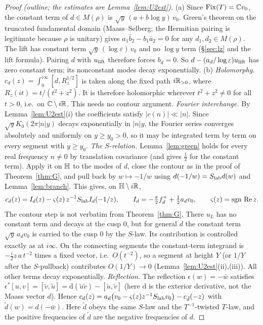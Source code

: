 \begin{proof}[Proof (outline; the estimates are Lemma~\ref{lem:U2est})]
(a) Since $\mathrm{Fix}(T)=\mathbb{C} v_0$, the constant term of $d\in M(\rho)$ is $\sqrt y\,(a+b\log y)\,v_0$. Green's theorem on the truncated fundamental domain (Maass--Selberg; the Hermitian pairing is legitimate because $\rho$ is unitary) gives $a_1\bar b_2-b_1\bar a_2=0$ for any $d_1,d_2\in M(\rho)$. The lift has constant term $\sqrt y\,(\log\varepsilon)\,v_0$ and no $\log y$ term (\S\ref{sec:lz} and the lift formula). Pairing $d$ with $u_{\rm lift}$ therefore forces $b_d=0$. So $d-(a_d/\log\varepsilon)u_{\rm lift}$ has zero constant term; its nonconstant modes decay exponentially.
(b) \emph{Holomorphy.} $c_d(z)=\int_0^{i\infty}[d,R_z^{1/2}]$ is taken along the fixed path $i\mathbb{R}_{>0}$, where $R_z(it)=t/(t^2+z^2)$. It is therefore holomorphic wherever $t^2+z^2\neq0$ for all $t>0$, i.e.\ on $\mathbb{C}\setminus i\mathbb{R}$. This needs no contour argument.
\emph{Fourier interchange.} By Lemma~\ref{lem:U2est}(i) the coefficients satisfy $|c(n)|\ll|n|$. Since $\sqrt yK_0(2\pi|n|y)$ decays exponentially in $|n|y$, the Fourier series converges absolutely and uniformly on $y\ge y_0>0$, so it may be integrated term by term on every segment with $y\ge y_0$.
\emph{The $S$-relation.} Lemma~\ref{lem:green} holds for every real frequency $n\neq0$ by translation covariance (and gives $\tfrac12$ for the constant term). Apply it on $\mathbb{H}$ to the modes of $d$, close the contour as in the proof of Theorem~\ref{thm:G}, and pull back by $w\mapsto-1/w$ using $d(-1/w)=S_{\rm lab}d(w)$ and Lemma~\ref{lem:branch}. This gives, on $\mathbb{H}\setminus i\mathbb{R}$,
\[
c_d(z)=I_d(z)-\varsigma(z)\,z^{-1}S_{\rm lab}I_d(-1/z),\qquad I_d=-\tfrac\pi2f_d^++\tfrac12a_dv_0,\qquad \varsigma(z)=\operatorname{sgn}\,\mathrm{Re}\,z.
\]
The contour step is not verbatim from Theorem~\ref{thm:G}. There $u_L$ has no constant term and decays at the cusp $0$, but for general $d$ the constant term $\sqrt y\,a_dv_0$ is carried to the cusp $0$ by the $S$-law. Its contribution is controlled exactly as at $i\infty$. On the connecting segments the constant-term integrand is $-\tfrac{i}{2}z\,a\,t^{-2}$ times a fixed vector, i.e.\ $O(t^{-2})$, so a segment at height $Y$ (or $1/Y$ after the $S$-pullback) contributes $O(1/Y)\to0$ (Lemma~\ref{lem:U2est}(ii),(iii)). All other terms decay exponentially.
\emph{Reflection.} The reflection $\epsilon(w)=-\bar w$ satisfies $\epsilon^*[u,v]=[\tilde v,\tilde u]=\mathrm{d}(\tilde u\tilde v)-[\tilde u,\tilde v]$ (here $\mathrm{d}$ is the exterior derivative, not the Maass vector $d$). Hence $c_d(z)=a_d\bigl(v_0-\varsigma(z)z^{-1}S_{\rm lab}v_0\bigr)-c_{\tilde d}(-z)$ with $\tilde d(w)=d(-\bar w)$. Here $\tilde d$ obeys the same $S$-law and the $T^{-1}$-twisted $T$-law, and the positive frequencies of $\tilde d$ are the negative frequencies of $d$.

\end{proof}
